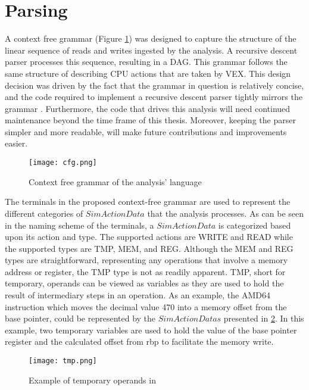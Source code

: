 \section{Parsing}
A context free grammar (Figure \ref{fig:cfg}) was designed to capture the structure of the linear sequence of reads and writes ingested by the analysis. A recursive descent parser processes this sequence, resulting in a DAG. This grammar follows the same structure of describing CPU actions that are taken by VEX. This design decision was driven by the fact that the grammar in question is relatively concise, and the code required to implement a recursive descent parser tightly mirrors the grammar \citep{redziejowski2007parsing}. Furthermore, the code that drives this analysis will need continued maintenance beyond the time frame of this thesis. Moreover, keeping the parser simpler and more readable, will make future contributions and improvements easier.

\begin{figure}
    \centering
    \texttt{[image: cfg.png]}
    \caption{Context free grammar of the analysis' language}
    \label{fig:cfg}
\end{figure}

The terminals in the proposed context-free grammar  are used to represent the different categories of $SimActionData$ that the analysis processes. As can be seen in the naming scheme of the terminals, a $SimActionData$ is categorized based upon its action and type. The supported actions are WRITE and READ while the supported types are TMP, MEM, and REG. Although the MEM and REG types are straightforward, representing any operations that involve a memory address or register, the TMP type is not as readily apparent. TMP, short for temporary, operands can be viewed as variables as they are used to hold the result of intermediary steps in an operation. As an example, the AMD64 instruction  which moves the decimal value 470 into a memory offset from the base pointer, could be represented by the $SimActionDatas$ presented in \ref{fig:tmp}. In this example, two temporary variables are used to hold the value of the base pointer register and the calculated offset from rbp to facilitate the memory write. 

\begin{figure}
    \centering
    \texttt{[image: tmp.png]}
    \caption{Example of temporary operands in }
    \label{fig:tmp}
\end{figure}

